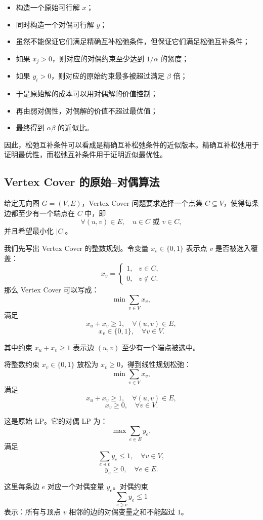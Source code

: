 \documentclass[UTF8,openany,12pt]{ctexbook}
\theoremstyle{remark}
\begin{document}
\begin{itemize}
  \item 构造一个原始可行解 $x$；
  \item 同时构造一个对偶可行解 $y$；
  \item 虽然不能保证它们满足精确互补松弛条件，但保证它们满足松弛互补条件；
  \item 如果 $x_j>0$，则对应的对偶约束至少达到 $1/\alpha$ 的紧度；
  \item 如果 $y_i>0$，则对应的原始约束最多被超过满足 $\beta$ 倍；
  \item 于是原始解的成本可以用对偶解的价值控制；
  \item 再由弱对偶性，对偶解的价值不超过最优值；
  \item 最终得到 $\alpha\beta$ 的近似比。
\end{itemize}

因此，松弛互补条件可以看成是精确互补松弛条件的近似版本。精确互补松弛用于证明最优性，而松弛互补条件用于证明近似最优性。

\subsection{Vertex Cover 的原始--对偶算法}

给定无向图 \(G=(V,E)\)，Vertex Cover 问题要求选择一个点集
\(C \subseteq V\)，使得每条边都至少有一个端点在 \(C\) 中，即
\[
  \forall (u,v)\in E,\quad u\in C \text{ 或 } v\in C,
\]
并且希望最小化 \(|C|\)。

我们先写出 Vertex Cover 的整数规划。令变量 \(x_v\in\{0,1\}\) 表示点
\(v\) 是否被选入覆盖：
\[
  x_v =
  \begin{cases}
    1, & v\in C,\\
    0, & v\notin C.
  \end{cases}
\]
那么 Vertex Cover 可以写成：
\[
  \min \sum_{v\in V} x_v,
\]
满足
\[
  x_u+x_v \ge 1,\quad \forall (u,v)\in E,
\]
\[
  x_v\in\{0,1\},\quad \forall v\in V.
\]

其中约束 \(x_u+x_v\ge 1\) 表示边 \((u,v)\) 至少有一个端点被选中。

将整数约束 \(x_v\in\{0,1\}\) 放松为 \(x_v\ge 0\)，得到线性规划松弛：
\[
  \min \sum_{v\in V} x_v,
\]
满足
\[
  x_u+x_v \ge 1,\quad \forall (u,v)\in E,
\]
\[
  x_v\ge 0,\quad \forall v\in V.
\]

这是原始 LP。它的对偶 LP 为：
\[
  \max \sum_{e\in E} y_e,
\]
满足
\[
  \sum_{e\ni v} y_e \le 1,\quad \forall v\in V,
\]
\[
  y_e\ge 0,\quad \forall e\in E.
\]

这里每条边 \(e\) 对应一个对偶变量 \(y_e\)。对偶约束
\[
  \sum_{e\ni v} y_e \le 1
\]
表示：所有与顶点 \(v\) 相邻的边的对偶变量之和不能超过 \(1\)。
\end{document}
